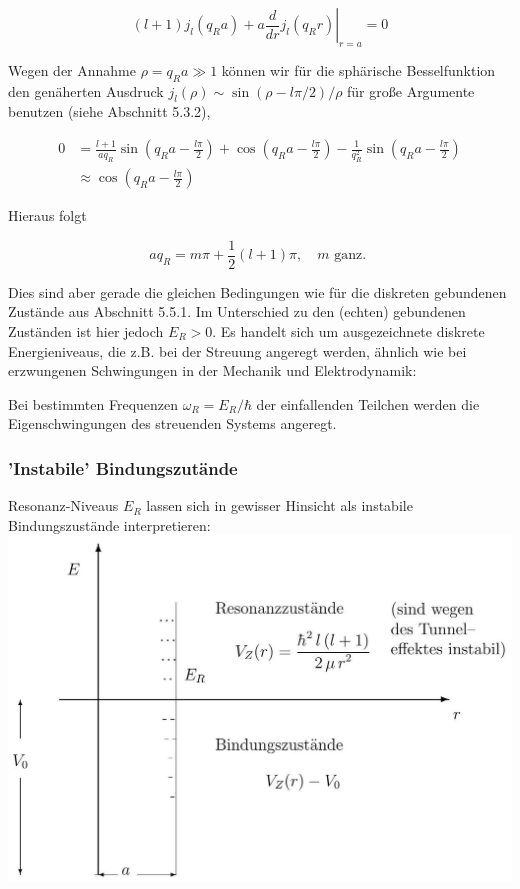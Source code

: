 \documentclass[10pt, letterpaper]{article}
\begin{document}
$$
(l+1) j_{l}\left(q_{R} a\right)+\left.a \frac{d}{d r} j_{l}\left(q_{R} r\right)\right|_{r=a}=0
$$

Wegen der Annahme $\rho=q_{R} a \gg 1$ können wir für die sphärische Besselfunktion den genäherten Ausdruck $j_{l}(\rho) \sim \sin (\rho-l \pi / 2) / \rho$ für große Argumente benutzen (siehe Abschnitt 5.3.2),

$$
\begin{aligned}
0 & =\frac{l+1}{a q_{R}} \sin \left(q_{R} a-\frac{l \pi}{2}\right)+\cos \left(q_{R} a-\frac{l \pi}{2}\right)-\frac{1}{q_{R}^{2}} \sin \left(q_{R} a-\frac{l \pi}{2}\right) \\
& \approx \cos \left(q_{R} a-\frac{l \pi}{2}\right)
\end{aligned}
$$

Hieraus folgt

$$
a q_{R}=m \pi+\frac{1}{2}(l+1) \pi, \quad m \text { ganz. }
$$

Dies sind aber gerade die gleichen Bedingungen wie für die diskreten gebundenen Zustände aus Abschnitt 5.5.1. Im Unterschied zu den (echten) gebundenen Zuständen ist hier jedoch $E_{R}>0$. Es handelt sich um ausgezeichnete diskrete Energieniveaus, die z.B. bei der Streuung angeregt werden, ähnlich wie bei erzwungenen Schwingungen in der Mechanik und Elektrodynamik:

Bei bestimmten Frequenzen $\omega_{R}=E_{R} / \hbar$ der einfallenden Teilchen werden die Eigenschwingungen des streuenden Systems angeregt.

\subsubsection*{'Instabile' Bindungszutände}
Resonanz-Niveaus $E_{R}$ lassen sich in gewisser Hinsicht als instabile Bindungszustände interpretieren:\\
\includegraphics[scale=0.2, center]{2025_05_21_d5590f158a899e385c7cg-21}
\end{document}
